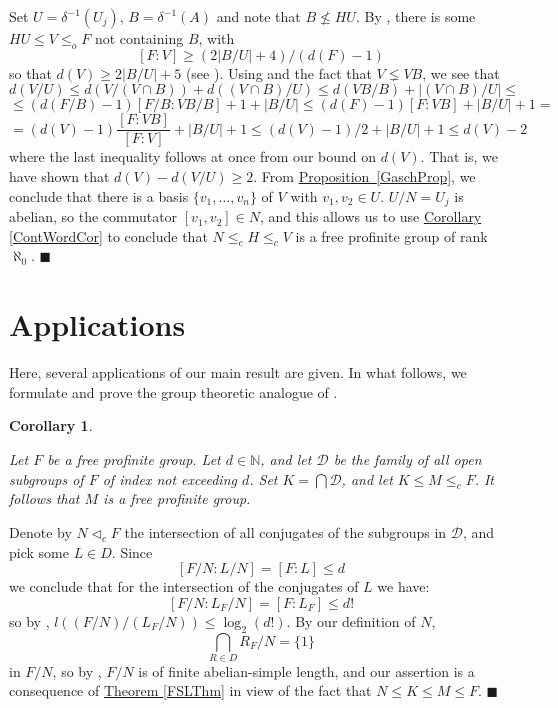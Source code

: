 \documentclass[12pt,a4paper]{article}
\newtheorem{corollary}[theorem]{Corollary}
\newenvironment{proof}[1][Proof]{\begin{trivlist}
\item[\hskip \labelsep {\bfseries #1}]}{\end{trivlist}}
\newcommand{\thmref}[1]{\hyperref[#1]{Theorem \ref*{#1}}}
\newcommand{\propref}[1]{\hyperref[#1]{Proposition \ref*{#1}}}
\newcommand{\corref}[1]{\hyperref[#1]{Corollary \ref*{#1}}}
\begin{document}
\begin{proof}
Set $U = \delta^{-1}(U_j)$, $B = \delta^{-1}(A)$ and note that $B \nleq HU$. By \mbox{\cite[Proposition 2.1.4 (d)]{RZ}}, there is some $HU \leq V \leq_o F$ not containing $B$, with $$[F : V] \geq (2|B/U| + 4)/(d(F) - 1)$$ so that $d(V) \geq 2|B/U| + 5$ (see \cite[Theorem 3.6.2 (b)]{RZ}). \newline Using \cite[Theorem 3.6.2 (b), Corollary 3.6.3]{RZ} and the fact that \mbox{$V \lneq VB$}, we see that $$d(V/U) \leq d(V/(V \cap B)) + d((V \cap B)/U) \leq d(VB/B) + |(V \cap B)/U| \leq $$ $$\leq (d(F/B) - 1)[F/B : VB/B] + 1 + |B/U| \leq (d(F) - 1)[F : VB] + |B/U| + 1 = $$ $$ = (d(V) - 1)\frac{[F:VB]}{[F:V]} + |B/U| + 1 \leq (d(V) - 1)/2 + |B/U| + 1 \leq d(V) - 2$$ where the last inequality follows at once from our bound on $d(V)$. That is, we have shown that $d(V) - d(V/U) \geq 2$. From \mbox{\propref{GaschProp}}, we conclude that there is a basis $\{ v_1, \dots, v_n \}$ of $V$ with $v_1, v_2 \in U$. $U/N = U_j$ is abelian, so the commutator $[v_1,v_2] \in  N$, and this allows us to use \corref{ContWordCor} to conclude that $N \leq_c H \leq_c V$ is a free profinite group of rank $\aleph_0$. $\blacksquare$

\end{proof}


\section{Applications}

Here, several applications of our main result are given. In what follows, we formulate and prove the group theoretic analogue of \mbox{\cite[Theorem 5.4]{BFW}}.

\begin{corollary} \label{IntersectionBoundedIndexCor}

Let $F$ be a free profinite group. Let $d \in \mathbb{N}$, and  let $\mathcal{D}$ be the family of all open subgroups of $F$ of index not exceeding $d$. Set $K = \bigcap \mathcal{D}$, and let $K \leq M \leq_c F$. It follows that $M$ is a free profinite group.

\end{corollary}

\begin{proof}

Denote by $N \lhd_c F$ the intersection of all conjugates of the subgroups in $\mathcal{D}$, and pick some $L \in D$. Since $$[F/N : L/N] = [F : L] \leq d$$ we conclude that for the intersection of the conjugates of $L$ we have: $$[F/N : L_F/N] = [F : L_F] \leq d!$$ so by \cite[Lemma 2.2]{BFW}, $l((F/N)/(L_F/N)) \leq \log_2(d!)$. By our definition of $N$, $$ \bigcap_{R \in D} R_F/N = \{1\}$$ in $F/N$, so by \cite[Proposition 2.8]{BFW}, $F/N$ is of finite abelian-simple length, and our assertion is a consequence of \thmref{FSLThm} in view of the fact that $N \leq K \leq M \leq F$. $\blacksquare$

\end{proof}
\end{document}
